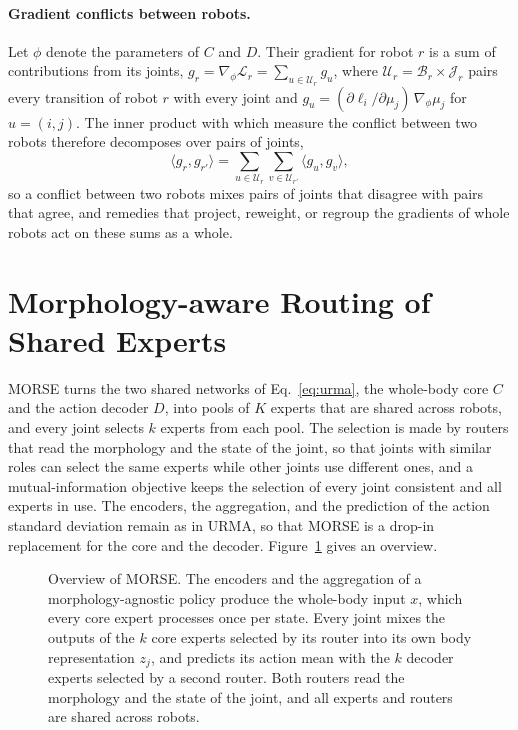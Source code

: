 \paragraph{Gradient conflicts between robots.}
Let $\phi$ denote the parameters of $C$ and $D$. Their gradient for robot $r$ is a sum of contributions from its
joints, $g_r=\nabla_\phi\mathcal{L}_r=\sum_{u\in\mathcal{U}_r}g_u$, where $\mathcal{U}_r=\mathcal{B}_r\times
\mathcal{J}_r$ pairs every transition of robot $r$ with every joint and $g_u=(\partial\ell_i/\partial\mu_j)\,
\nabla_\phi\mu_j$ for $u=(i,j)$. The inner product with which \citet{abe2026crossembodimentoffline} measure the
conflict between two robots therefore decomposes over pairs of joints,
\begin{equation}
\bigl\langle g_r,g_{r'}\bigr\rangle=\sum_{u\in\mathcal{U}_r}\sum_{v\in\mathcal{U}_{r'}}\bigl\langle g_u,g_v\bigr\rangle,
\label{eq:conflict}
\end{equation}
so a conflict between two robots mixes pairs of joints that disagree with pairs that agree, and remedies that project,
reweight, or regroup the gradients of whole robots act on these sums as a whole.

\section{Morphology-aware Routing of Shared Experts}
\label{sec:method}

MORSE turns the two shared networks of Eq.~\eqref{eq:urma}, the whole-body core $C$ and the action decoder $D$, into
pools of $K$ experts that are shared across robots, and every joint selects $k$ experts from each pool. The selection
is made by routers that read the morphology and the state of the joint, so that joints with similar roles can select
the same experts while other joints use different ones, and a mutual-information objective keeps the selection of
every joint consistent and all experts in use. The encoders, the aggregation, and the prediction of the action
standard deviation remain as in URMA, so that MORSE is a drop-in replacement for the core and the decoder.
Figure~\ref{fig:overview} gives an overview.

\begin{figure}[t]
\centering
\fbox{\rule{0pt}{1.6in}\rule{0.95\textwidth}{0pt}}
\caption{Overview of MORSE. The encoders and the aggregation of a morphology-agnostic policy produce the whole-body
input $x$, which every core expert processes once per state. Every joint mixes the outputs of the $k$ core experts
selected by its router into its own body representation $z_j$, and predicts its action mean with the $k$ decoder
experts selected by a second router. Both routers read the morphology and the state of the joint, and all experts and
routers are shared across robots.}
\label{fig:overview}
\end{figure}


